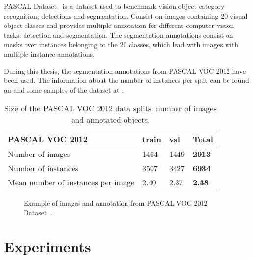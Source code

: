 PASCAL Dataset~\cite{Everingham10} is a dataset used to benchmark vision object category recognition, detections and segmentation.
Consist on images containing 20 visual object classes and provides multiple annotation for different computer vision tasks: detection and segmentation.
The segmentation annotations consist on masks over instances belonging to the 20 classes, which lead with images with multiple instance annotations.

During this thesis, the segmentation annotations from PASCAL VOC 2012 have been used. The information about the number of instances per split can be found on  and some samples of the dataset at .

\begin{table}[h]
  \centering
  \begin{tabular}{l|ll|l}
  \toprule
  PASCAL VOC 2012                    & train & val  & \textbf{Total} \\
  \midrule
  Number of images                   & 1464  & 1449 & \textbf{2913}  \\
  Number of instances                & 3507  & 3427 & \textbf{6934}  \\
  Mean number of instances per image & 2.40  & 2.37 & \textbf{2.38}  \\
  \bottomrule
  \end{tabular}
  \caption{Size of the PASCAL VOC 2012 data splits: number of images and annotated objects.}
  \label{tab:pascal}
\end{table}


\begin{figure}[h]
  \centering
  \caption{Example of images and annotation from PASCAL VOC 2012 Dataset~\cite{Everingham10}.}
  \label{fig:pascal}
\end{figure}



\section{Experiments}


